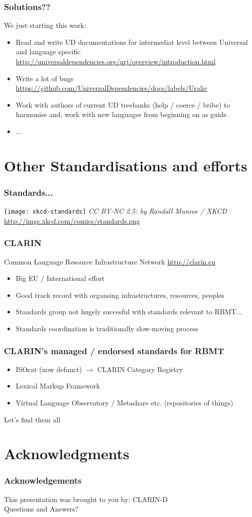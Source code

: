 \documentclass{beamer}
\begin{document}
\begin{frame}
    \frametitle{Solutions??}
    We just starting this work:
    \begin{itemize}
        \item Read and write UD documentations for intermediat level between
            Universal and language specific \url{http://universaldependencies.org/urj/overview/introduction.html}
        \item Write a lot of bugs \url{https://github.com/UniversalDependencies/docs/labels/Uralic}
        \item Work with authors of current UD treebanks (help / coerce / bribe)
            to harmonise and, work with new languages from beginning on as
            guide
        \item ...
    \end{itemize}
\end{frame}

\section{Other Standardisations and efforts}

\begin{frame}
    \frametitle{Standards...}
    \texttt{[image: xkcd-standards]}
    \textit{CC BY-NC 2.5: by Randall Munroe / XKCD} 
    \url{http://imgs.xkcd.com/comics/standards.png}
\end{frame}

\begin{frame}
    \frametitle{CLARIN}
    Common Language Resource Infrastructure Network
    \url{http://clarin.eu}
    \begin{itemize}
        \item Big EU / International effort
        \item Good track record with organsing infrastructures, resources,
            peoples
        \item Standards group not hugely succesful with standards relevant to
            RBMT...
        \item Standards coordination is traditionally slow-moving process
    \end{itemize}
\end{frame}

\begin{frame}
    \frametitle{CLARIN's managed / endorsed standards for RBMT}
    \begin{itemize}
        \item ISOcat (now defunct) $\rightarrow$ CLARIN Category Registry
        \item Lexical Markup Framework
        \item Virtual Language Observatory / Metashare etc. (repositories of
            things)
    \end{itemize}
    Let's find them all
\end{frame}

\section{Acknowledgments}

\begin{frame}
    \frametitle{Acknowledgements}
    This presentation was brought to you by: CLARIN-D\\
    \vspace{2em}
    Questions and Answers?
\end{frame}
\end{document}
